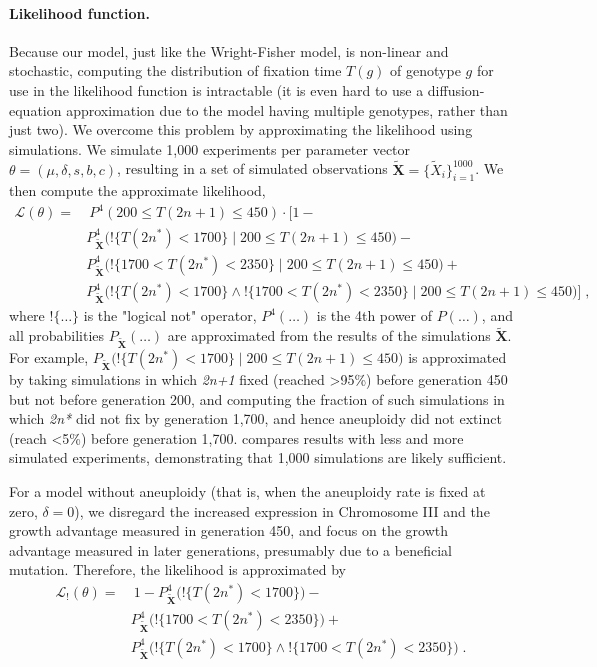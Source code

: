 \documentclass[12pt]{extarticle}
\let\vec\mathbf
\newcommand{\likelihood}{\mathcal{L}}
\newcommand{\anwt}{\emph{2n+1}}
\newcommand{\eumt}{\emph{2n*}}
\begin{document}
\paragraph{Likelihood function.} 
Because our model, just like the Wright-Fisher model, is non-linear and stochastic, computing the distribution of fixation time $T(g)$ of genotype $g$ for use in the likelihood function is intractable (it is even hard to use a diffusion-equation approximation due to the model having multiple genotypes, rather than just two).
We overcome this problem by approximating the likelihood using simulations. We simulate 1,000 experiments per parameter vector $\theta = (\mu, \delta, s, b, c)$, resulting in a set of simulated observations $\tilde{\vec X} = \{\tilde{X}_i\}_{i=1}^{1000}$. We then compute the approximate likelihood,
\begin{equation}\begin{aligned}
\label{eq:heatstress-likelihood}
\likelihood(\theta) = &\ P^4(200 \le T(2n+1) \le 450) \cdot 
	\Big[1 - \\
	&	P_{\tilde{\vec X}}^4\big(!\{T(2n^*)<1700\} \mid 200 \le T(2n+1) \le 450\big)- \\
	&	P_{\tilde{\vec X}}^4\big(!\{1700 < T(2n^*) < 2350\} \mid 200 \le T(2n+1) \le 450\big)+ \\
	&	P_{\tilde{\vec X}}^4\big(!\{T(2n^*)<1700\} \land !\{1700 < T(2n^*) < 2350\} \mid 200 \le T(2n+1) \le 450\big) 
	\Big]\;,
\end{aligned}\end{equation}
where $!\{\ldots\}$ is the "logical not" operator, $P^4(\ldots)$ is the 4th power of $P(\ldots)$, and all probabilities $P_{\tilde{\vec X}}(\ldots)$ are approximated from the results of the simulations $\tilde{\vec X}$. For example, $P_{\tilde{\vec X}}\big(!\{T(2n^*)<1700\} \mid 200 \le T(2n+1) \le 450\big)$ is approximated by taking simulations in which \anwt\; fixed (reached >95\%) before generation 450 but not before generation 200, and computing the fraction of such simulations in which \eumt\; did not fix by generation 1,700, and hence aneuploidy did not extinct (reach <5\%) before generation 1,700.
 compares results with less and more simulated experiments, demonstrating that 1,000 simulations are likely sufficient.
 
For a model without aneuploidy (that is, when the aneuploidy rate is fixed at zero, $\delta=0$), we disregard the increased expression in Chromosome III and the growth advantage measured in generation 450, and focus on the growth advantage measured in later generations, presumably due to a beneficial mutation. 
Therefore, the likelihood is approximated by
\begin{equation}\begin{aligned}
\label{eq:heatstress-noaneuploidy-likelihood}
\likelihood_{!}(\theta) = &\ 
	1 - 
	P_{\tilde{\vec X}}^4\big(!\{T(2n^*)<1700\}\big) - \\
&	P_{\tilde{\vec X}}^4\big(!\{1700 < T(2n^*) < 2350\}\big) + \\
&	P_{\tilde{\vec X}}^4\big(!\{T(2n^*)<1700\} \land !\{1700 < T(2n^*) < 2350\}\big)
\;.
\end{aligned}\end{equation}
\end{document}
